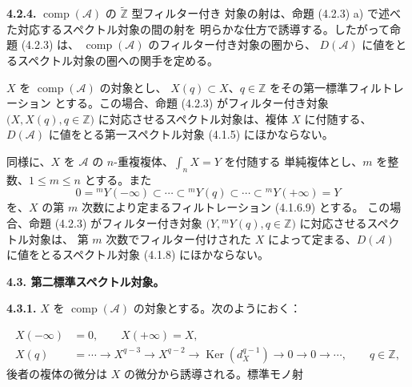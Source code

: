 \clearpage
{}%
\begingroup\small\setlength{\parskip}{0pt}\setlength{\emergencystretch}{1.5em}
\setlength{\abovedisplayskip}{4pt plus 2pt minus 2pt}%
\setlength{\belowdisplayskip}{4pt plus 2pt minus 2pt}%

\noindent\textbf{4.2.4.}\quad
$\operatorname{comp}(\mathcal A)$ の $\widetilde{\mathbb Z}$ 型フィルター付き
対象の射は、命題 (4.2.3) a) で述べた対応するスペクトル対象の間の射を
明らかな仕方で誘導する。したがって命題 (4.2.3) は、
$\operatorname{comp}(\mathcal A)$ のフィルター付き対象の圏から、
$D(\mathcal A)$ に値をとるスペクトル対象の圏への関手を定める。

$X$ を $\operatorname{comp}(\mathcal A)$ の対象とし、
$X(q)\subset X$、$q\in\mathbb Z$ をその第一標準フィルトレーション
とする。この場合、命題 (4.2.3) がフィルター付き対象
$\bigl(X,X(q),q\in\mathbb Z\bigr)$ に対応させるスペクトル対象は、複体
$X$ に付随する、$D(\mathcal A)$ に値をとる第一スペクトル対象 (4.1.5)
にほかならない。

同様に、$X$ を $\mathcal A$ の $n$-重複複体、$\int_n X=Y$ を付随する
単純複体とし、$m$ を整数、$1\leq m\leq n$ とする。また
\[
0={}^{m}\!Y(-\infty)\subset\cdots\subset{}^{m}\!Y(q)
\subset\cdots\subset{}^{m}\!Y(+\infty)=Y
\]
を、$X$ の第 $m$ 次数により定まるフィルトレーション (4.1.6.9) とする。
この場合、命題 (4.2.3) がフィルター付き対象
$\bigl(Y,{}^{m}\!Y(q),q\in\mathbb Z\bigr)$ に対応させるスペクトル対象は、
第 $m$ 次数でフィルター付けされた $X$ によって定まる、$D(\mathcal A)$
に値をとるスペクトル対象 (4.1.8) にほかならない。

\medskip\noindent\textbf{4.3. 第二標準スペクトル対象。}

\noindent\textbf{4.3.1.}\quad
$X$ を $\operatorname{comp}(\mathcal A)$ の対象とする。次のようにおく：

\begin{equation}
\begin{aligned}
X(-\infty)&=0,\qquad X(+\infty)=X,\\
X(q)&=\cdots\longrightarrow X^{q-3}\longrightarrow X^{q-2}
\longrightarrow\operatorname{Ker}(d_X^{q-1})
\longrightarrow0\longrightarrow0\longrightarrow\cdots,
\qquad q\in\mathbb Z,
\end{aligned}
\tag{4.3.1.1}
\end{equation}
後者の複体の微分は $X$ の微分から誘導される。標準モノ射

